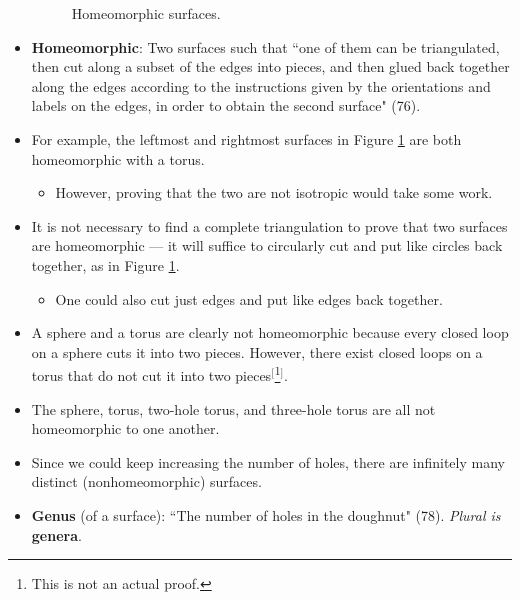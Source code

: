 \documentclass[titlepage]{article}
\numberwithin{figure}{section}
\numberwithin{table}{section}
\numberwithin{equation}{section}
\newcommand{\dq}[2]{``#1" (#2).}
\begin{document}
\begin{itemize}
\begin{figure}[h!]
        \vspace{-1.2em}
        \caption{Homeomorphic surfaces.}
        \label{fig:homeo}
    \end{figure}
    \item \textbf{Homeomorphic}: Two surfaces such that \dq{one of them can be triangulated, then cut along a subset of the edges into pieces, and then glued back together along the edges according to the instructions given by the orientations and labels on the edges, in order to obtain the second surface}{76}
    \item For example, the leftmost and rightmost surfaces in Figure \ref{fig:homeo} are both homeomorphic with a torus.
    \begin{itemize}
        \item However, proving that the two are not isotropic would take some work.
    \end{itemize}
    \item It is not necessary to find a complete triangulation to prove that two surfaces are homeomorphic --- it will suffice to circularly cut and put like circles back together, as in Figure \ref{fig:homeo}.
    \begin{itemize}
        \item One could also cut just edges and put like edges back together.
    \end{itemize}
    \item A sphere and a torus are clearly not homeomorphic because every closed loop on a sphere cuts it into two pieces. However, there exist closed loops on a torus that do not cut it into two pieces$^[$\footnote{This is not an actual proof.}$^]$.
    \item The sphere, torus, two-hole torus, and three-hole torus are all not homeomorphic to one another.
    \item Since we could keep increasing the number of holes, there are infinitely many distinct (nonhomeomorphic) surfaces.
    \item \textbf{Genus} (of a surface): \dq{The number of holes in the doughnut}{78} \emph{Plural is} \textbf{genera}.

\end{itemize}
\end{document}
